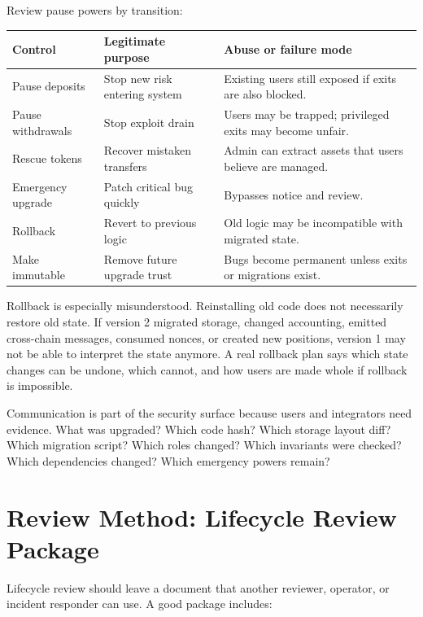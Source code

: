Review pause powers by transition:

\begin{table}[htbp]
\centering
\small
\renewcommand{\arraystretch}{1.15}
\begin{tabularx}{\textwidth}{@{}>{\RaggedRight\arraybackslash}p{}>{\RaggedRight\arraybackslash}p{}X@{}}
\toprule
Control & Legitimate purpose & Abuse or failure mode \\
\midrule
Pause deposits & Stop new risk entering system & Existing users still exposed if exits are also blocked. \\
Pause withdrawals & Stop exploit drain & Users may be trapped; privileged exits may become unfair. \\
Rescue tokens & Recover mistaken transfers & Admin can extract assets that users believe are managed. \\
Emergency upgrade & Patch critical bug quickly & Bypasses notice and review. \\
Rollback & Revert to previous logic & Old logic may be incompatible with migrated state. \\
Make immutable & Remove future upgrade trust & Bugs become permanent unless exits or migrations exist. \\
\bottomrule
\end{tabularx}
\end{table}

Rollback is especially misunderstood. Reinstalling old code does not necessarily restore old state. If version 2 migrated storage, changed accounting, emitted cross-chain messages, consumed nonces, or created new positions, version 1 may not be able to interpret the state anymore. A real rollback plan says which state changes can be undone, which cannot, and how users are made whole if rollback is impossible.

Communication is part of the security surface because users and integrators need evidence. What was upgraded? Which code hash? Which storage layout diff? Which migration script? Which roles changed? Which invariants were checked? Which dependencies changed? Which emergency powers remain?

\section{Review Method: Lifecycle Review Package}

Lifecycle review should leave a document that another reviewer, operator, or incident responder can use. A good package includes:

